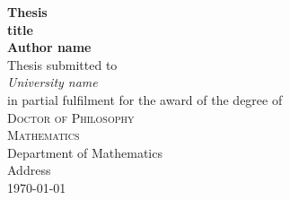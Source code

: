 \begin{titlepage}
\begin{center}
  {\huge\bfseries Thesis \\[1ex]
                  title}                  \\[6.5ex]
  {\large\bfseries Author name}           \\
  \vspace{4ex}
  Thesis  submitted to                    \\[5pt]
  \textit{University name}                \\[2cm]
  in partial fulfilment for the award of the degree of \\[2cm]
  \textsc{\Large Doctor of Philosophy}    \\[2ex]
  \textsc{\large Mathematics}             \\[12ex]
  \vfill
  Department of Mathematics               \\
  Address                                 \\
  \vfill
  \today
\end{center}
\end{titlepage}
